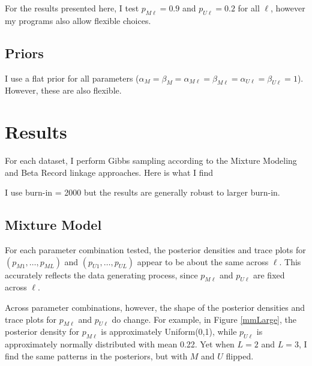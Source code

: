 \documentclass[11pt,reqno]{amsart}
\begin{document}
For the results presented here, I test $p_{M\ell} = 0.9$ and $p_{U\ell}=0.2$ for all $\ell$, however my programs also allow flexible choices.

\subsection{Priors}

I use a flat prior for all parameters ($\alpha_M=\beta_M=\alpha_{M\ell}=\beta_{M\ell}=\alpha_{U\ell}=\beta_{U\ell}=1$).  However, these are also flexible.  %


\section{Results}

For each dataset, I perform Gibbs sampling according to the Mixture Modeling and Beta Record linkage approaches.  Here is what I find

I use burn-in = 2000 but the results are generally robust to larger burn-in.

\subsection{Mixture Model} 

For each parameter combination tested, the posterior densities and trace plots for $(p_{M1}, \dots, p_{ML})$ and $(p_{U1}, \dots, p_{UL})$ appear to be about the same across $\ell$.  This accurately reflects the data generating process, since $p_{M\ell}$ and $p_{U\ell}$ are fixed across $\ell$. 

Across parameter combinations, however, the shape of the posterior densities and trace plots for $p_{M\ell}$ and $p_{U\ell}$ do change.  For example, in Figure \ref{mmLarge}, the posterior density for $p_{M\ell}$ is approximately Uniform(0,1), while $p_{U\ell}$ is approximately normally distributed with mean 0.22.  Yet when $L=2$ and $L=3$, I find the same patterns in the posteriors, but with $M$ and $U$ flipped.
\end{document}
